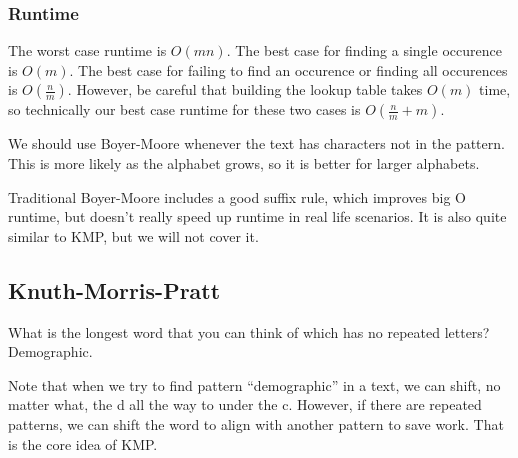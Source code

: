 
\subsubsection{Runtime}

The worst case runtime is \( O(mn) \). The best case for finding a single occurence is \( O(m) \). The best case for failing to find an occurence or finding all occurences is \( O(\frac{n}{m}) \). However, be careful that building the lookup table takes \( O(m) \) time, so technically our best case runtime for these two cases is \( O(\frac{n}{m} +m) \).

\begin{note}
	We should use Boyer-Moore whenever the text has characters not in the pattern. This is more likely as the alphabet grows, so it is better for larger alphabets. 
\end{note}

Traditional Boyer-Moore includes a good suffix rule, which improves big O runtime, but doesn't really speed up runtime in real life scenarios. It is also quite similar to KMP, but we will not cover it.

\subsection{Knuth-Morris-Pratt}

What is the longest word that you can think of which has no repeated letters? Demographic.

Note that when we try to find pattern	``demographic'' in a text, we can shift, no matter what, the d all the way to under the c. However, if there are repeated patterns, we can shift the word to align with another pattern to save work. That is the core idea of KMP.
